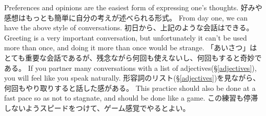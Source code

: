 \documentclass[uplatex,dvipdfmx,b5paper,english,10pt]{jsbook}
\begin{document}
\ifEnglish
Preferences and opinions are the easiest form of expressing one's thoughts.
\else
好みや感想はもっとも簡単に自分の考えが述べられる形式。
\fi
\ifEnglish
From day one, we can have the above style of conversations.
\else
初日から、上記のような会話はできる。
\fi
\ifEnglish
Greeting is a very important conversation, but unfortunately it can't be used more than once, and doing it more than once would be strange.
\else
「あいさつ」はとても重要な会話であるが、残念ながら何回も使えないし、何回もすると奇妙である。
\fi
\ifEnglish
If you partner many conversations with a list of adjectives(\S \ref{adjectives}), you will feel like you speak naturally.
\else
形容詞のリスト(\S \ref{adjectives})を見ながら、何回もやり取りすると話した感がある。
\fi
\ifEnglish
This practice should also be done at a fast pace so as not to stagnate, and should be done like a game.
\else
この練習も停滞しないようスピードをつけて、ゲーム感覚でやるとよい。
\fi
\end{document}
